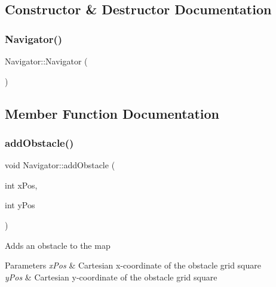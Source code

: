 \subsection{Constructor \& Destructor Documentation}
\mbox{\label{class_navigator_a59230ab4698882f754d5ce275a1a4030}} 
\subsubsection{\texorpdfstring{Navigator()}{Navigator()}}
{\footnotesize\ttfamily Navigator\+::\+Navigator (\begin{DoxyParamCaption}{ }\end{DoxyParamCaption})}



\subsection{Member Function Documentation}
\mbox{\label{class_navigator_af5a35f0ae71309c1b276257709b24390}} 
\subsubsection{\texorpdfstring{add\+Obstacle()}{addObstacle()}}
{\footnotesize\ttfamily void Navigator\+::add\+Obstacle (\begin{DoxyParamCaption}\item[{int}]{x\+Pos,  }\item[{int}]{y\+Pos }\end{DoxyParamCaption})}

Adds an obstacle to the map


\begin{DoxyParams}{Parameters}
{\em x\+Pos} & Cartesian x-\/coordinate of the obstacle grid square \\
\hline
{\em y\+Pos} & Cartesian y-\/coordinate of the obstacle grid square \\
\hline
\end{DoxyParams}
\mbox{\label{class_navigator_a7a745d33cfa5cdfc551c87f3f23dc28e}} 
